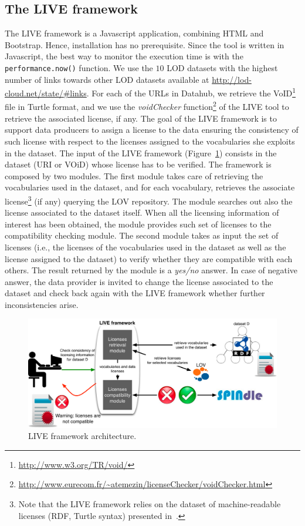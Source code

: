\subsection{The LIVE framework}
The LIVE framework is a Javascript application, combining HTML and Bootstrap. Hence, installation has no prerequisite. Since the tool is written in Javascript, the best way to monitor the execution time is with the \texttt{performance.now()} function. We use the $10$ LOD datasets with the highest number of links towards other LOD datasets available at \url{http://lod-cloud.net/state/#links}. For each of the URLs in Datahub, we retrieve the VoID\footnote{\url{http://www.w3.org/TR/void/}} file in Turtle format, and we use the \textit{voidChecker} function\footnote{\url{http://www.eurecom.fr/~atemezin/licenseChecker/voidChecker.html}} of the LIVE tool to retrieve the associated license, if any.  
The goal of the LIVE framework is to support data producers to assign a license to the data ensuring the consistency of such license with respect to the licenses assigned to the vocabularies she exploits in the dataset. 
The input of the LIVE framework (Figure~\ref{fig:framework}) consists in the dataset (URI or VOiD) whose license has to be verified. The framework is composed by two modules. The first module takes care of retrieving the vocabularies used in the dataset, and for each vocabulary, retrieves the associate license\footnote{Note that the LIVE framework relies on the dataset of machine-readable licenses (RDF, Turtle syntax) presented in~\cite{CabrioESWC2014}.} (if any) querying the LOV repository. 
The module searches out also the license associated to the dataset itself. When all the licensing information of interest has been obtained, the module provides such set of licenses to the compatibility checking module. 
The second module takes as input the set of licenses (i.e., the licenses of the vocabularies used in the dataset as well as the license assigned to the dataset) to verify whether they are compatible with each others. The result returned by the module is a \textit{yes/no} answer. In case of negative answer, the data provider is invited to change the license associated to the dataset and check back again with the LIVE framework whether further inconsistencies arise.

\begin{figure}
\centering
\includegraphics[width=12.0cm]{img/live-framework.pdf}
\caption{LIVE framework architecture.}
\label{fig:framework}
\end{figure}


